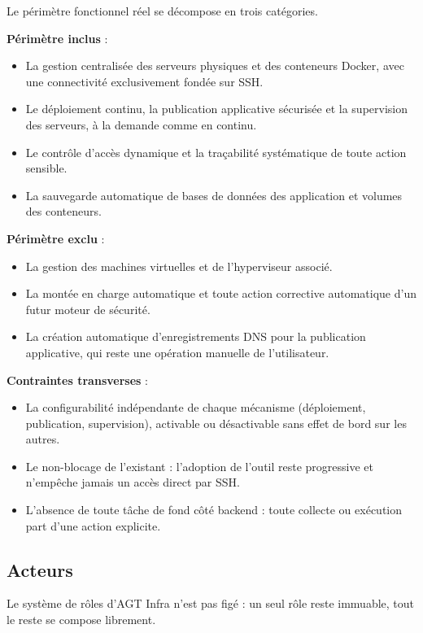 Le périmètre fonctionnel réel se décompose en trois catégories.

\medskip
\noindent\textbf{Périmètre inclus} :
\begin{itemize}
  \item La gestion centralisée des serveurs physiques et des conteneurs
        Docker, avec une connectivité exclusivement fondée
        sur SSH.
  \item Le déploiement continu, la publication applicative sécurisée et
        la supervision des serveurs, à la demande comme en continu.
  \item Le contrôle d'accès dynamique et la traçabilité systématique de
        toute action sensible.
  \item La sauvegarde automatique de bases de données des application et
        volumes des conteneurs.
\end{itemize}

\medskip
\noindent\textbf{Périmètre exclu} :
\begin{itemize}
  \item La gestion des machines virtuelles et de l'hyperviseur associé.
  \item La montée en charge automatique et toute action corrective
        automatique d'un futur moteur de sécurité.
  \item La création automatique d'enregistrements DNS pour la publication
        applicative, qui reste une opération manuelle de l'utilisateur.
\end{itemize}

\medskip
\noindent\textbf{Contraintes transverses} :
\begin{itemize}
  \item La configurabilité indépendante de chaque mécanisme (déploiement,
        publication, supervision), activable ou désactivable sans effet
        de bord sur les autres.
  \item Le non-blocage de l'existant : l'adoption de l'outil reste
        progressive et n'empêche jamais un accès direct par SSH.
  \item L'absence de toute tâche de fond côté backend : toute collecte ou
        exécution part d'une action explicite.
\end{itemize}

\subsection{Acteurs}

Le système de rôles d'AGT Infra n'est pas figé : un seul rôle reste
immuable, tout le reste se compose librement.

